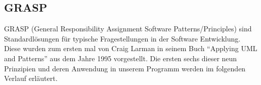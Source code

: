 \subsection{GRASP}
GRASP (General Responsibility Assignment Software Patterns/Principles) sind Standardlösungen für typische Fragestellungen in der Software Entwicklung.
Diese wurden zum ersten mal von Craig Larman in seinem Buch \enquote{Applying UML and Patterns} aus dem Jahre 1995 vorgestellt.
Die ersten sechs dieser neun Prinzipien und deren Anwendung in unserem Programm werden im folgenden Verlauf erläutert.

